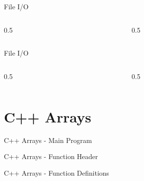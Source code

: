 \documentclass[aspectratio=1610]{beamer}
\begin{document}
\begin{frame}{File I/O}
\begin{columns}[c]
  \begin{column}{0.5\textwidth}
    
  \end{column}
  \begin{column}{0.5\textwidth}
    
  \end{column}
\end{columns}
\end{frame}

\begin{frame}{File I/O}
\begin{columns}[c]
  \begin{column}{0.5\textwidth}
    
  \end{column}
  \begin{column}{0.5\textwidth}
    
  \end{column}
\end{columns}
\end{frame}

\section{C++ Arrays}

\begin{frame}[allowframebreaks]{C++ Arrays - Main Program}
 
\end{frame}

\begin{frame}[allowframebreaks]{C++ Arrays - Function Header}
 
\end{frame}

\begin{frame}[allowframebreaks]{C++ Arrays - Function Definitions}
 
\end{frame}
\end{document}
